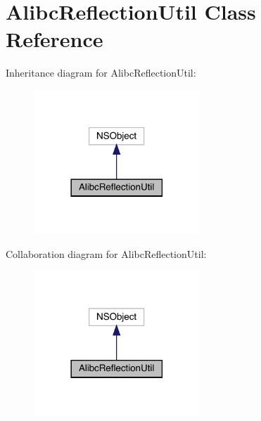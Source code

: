 \hypertarget{interface_alibc_reflection_util}{}\section{Alibc\+Reflection\+Util Class Reference}
\label{interface_alibc_reflection_util}


Inheritance diagram for Alibc\+Reflection\+Util\+:\nopagebreak
\begin{figure}[H]
\begin{center}
\leavevmode
\includegraphics[width=177pt]{interface_alibc_reflection_util__inherit__graph}
\end{center}
\end{figure}


Collaboration diagram for Alibc\+Reflection\+Util\+:\nopagebreak
\begin{figure}[H]
\begin{center}
\leavevmode
\includegraphics[width=177pt]{interface_alibc_reflection_util__coll__graph}
\end{center}
\end{figure}
